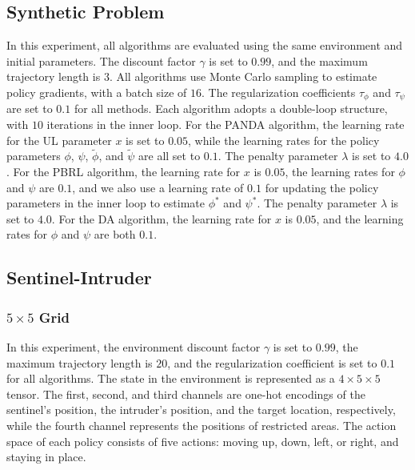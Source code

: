 \documentclass{article}
\theoremstyle{plain}
\theoremstyle{definition}
\theoremstyle{remark}
\begin{document}
\subsection{Synthetic Problem}
\label{appendix: synthetic-problem-details}
In this experiment, all algorithms are evaluated using the same environment and initial parameters. The discount factor $\gamma$ is set to $0.99$, and the maximum trajectory length is $3$. All algorithms use Monte Carlo sampling to estimate policy gradients, with a batch size of $16$. The regularization coefficients $\tau_\phi$ and $\tau_\psi$ are set to $0.1$ for all methods. Each algorithm adopts a double-loop structure, with $10$ iterations in the inner loop.
For the PANDA algorithm, the learning rate for the UL parameter $x$ is set to $0.05$, while the learning rates for the policy parameters $\phi$, $\psi$, $\tilde{\phi}$, and $\tilde{\psi}$ are all set to $0.1$. The penalty parameter $\lambda$ is set to $4.0$. For the PBRL algorithm, the learning rate for $x$ is $0.05$, the learning rates for $\phi$ and $\psi$ are $0.1$, and we also use a learning rate of $0.1$ for updating the policy parameters in the inner loop to estimate $\phi^*$ and $\psi^*$. The penalty parameter $\lambda$ is set to $4.0$. For the DA algorithm, the learning rate for $x$ is $0.05$, and the learning rates for $\phi$ and $\psi$ are both $0.1$. 

\subsection{Sentinel-Intruder}
\label{appendix: sentinel-intruder-details}
\subsubsection{$5\times 5$ Grid}
In this experiment, the environment discount factor $\gamma$ is set to $0.99$, the maximum trajectory length is $20$, and the regularization coefficient is set to $0.1$ for all algorithms.
The state in the environment is represented as a $4 \times 5 \times 5$ tensor. The first, second, and third channels are one-hot encodings of the sentinel's position, the intruder's position, and the target location, respectively, while the fourth channel represents the positions of restricted areas.
The action space of each policy consists of five actions: moving up, down, left, or right, and staying in place.
\end{document}
